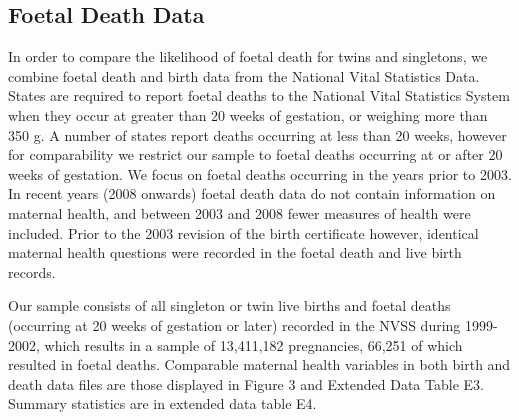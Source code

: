 \documentclass{nature}
\begin{document}
\begin{linenumbers}
\subsection{Foetal Death Data}
In order to compare the likelihood of foetal death for twins and singletons, we combine foetal death and birth data from the National Vital Statistics Data. States are required to report foetal deaths to the National Vital Statistics System when they occur at greater than 20 weeks of gestation, or weighing more than 350 g. A number of states report deaths occurring at less than 20 weeks, however for comparability we restrict our sample to foetal deaths occurring at or after 20 weeks of gestation.  We focus on foetal deaths occurring in the years prior to 2003.  In recent years (2008 onwards) foetal death data do not contain information on maternal health, and between 2003 and 2008 fewer measures of health were included.  Prior to the 2003 revision of the birth certificate however, identical maternal health questions were recorded in the foetal death and live birth records.

Our sample consists of all singleton or twin live births and foetal deaths (occurring at 20 weeks of gestation or later) recorded in the NVSS during 1999-2002, which results in a sample of 13,411,182 pregnancies, 66,251 of which resulted in foetal deaths. Comparable maternal health variables in both birth and death data files are those displayed in Figure 3 and Extended Data Table E3. %
Summary statistics are in extended data table E4.

\clearpage


\end{linenumbers}
\end{document}
